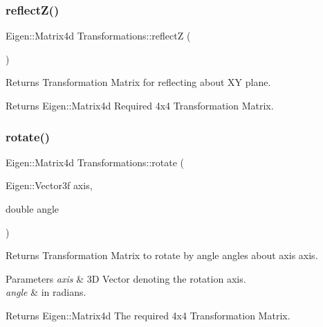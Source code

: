 \subsubsection{\texorpdfstring{reflect\+Z()}{reflectZ()}}
{\footnotesize\ttfamily Eigen\+::\+Matrix4d Transformations\+::reflectZ (\begin{DoxyParamCaption}{ }\end{DoxyParamCaption})}



Returns Transformation Matrix for reflecting about XY plane. 

\begin{DoxyReturn}{Returns}
Eigen\+::\+Matrix4d Required 4x4 Transformation Matrix. 
\end{DoxyReturn}
\mbox{\label{classTransformations_a9d470736a0a55415259c9eea0bf8a2e0}} 
\subsubsection{\texorpdfstring{rotate()}{rotate()}}
{\footnotesize\ttfamily Eigen\+::\+Matrix4d Transformations\+::rotate (\begin{DoxyParamCaption}\item[{Eigen\+::\+Vector3f}]{axis,  }\item[{double}]{angle }\end{DoxyParamCaption})}



Returns Transformation Matrix to rotate by \textquotesingle{}angle\textquotesingle{} angles about \textquotesingle{}axis\textquotesingle{} axis. 


\begin{DoxyParams}{Parameters}
{\em axis} & 3D Vector denoting the rotation axis. \\
\hline
{\em angle} & in radians. \\
\hline
\end{DoxyParams}
\begin{DoxyReturn}{Returns}
Eigen\+::\+Matrix4d The required 4x4 Transformation Matrix. 
\end{DoxyReturn}
\mbox{\label{classTransformations_a4c54165181c5d5ec5bb7db9e3176c4a7}} 
